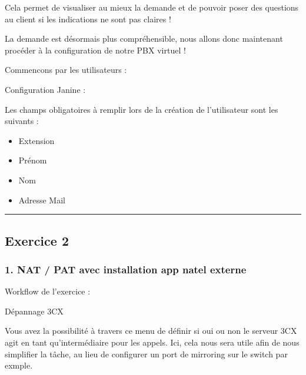 \documentclass[letterpaper,10pt,french]{sphinxmanual}
\begin{document}
\sphinxAtStartPar
Cela permet de visualiser au mieux la demande et de pouvoir poser des questions au client si les indications ne sont pas claires !

\noindent{}

\sphinxAtStartPar
La demande est désormais plus compréhensible, nous allons donc maintenant procéder à la configuration de notre PBX virtuel !

\sphinxAtStartPar
Commencons par les utilisateurs :

\sphinxAtStartPar


\noindent{}

\sphinxAtStartPar
Configuration Janine :

\noindent{}

\sphinxAtStartPar
Les champs obligatoires à remplir lors de la création de l’utilisateur sont les suivants :
\begin{itemize}
\item {} 
\sphinxAtStartPar
Extension

\item {} 
\sphinxAtStartPar
Prénom

\item {} 
\sphinxAtStartPar
Nom

\item {} 
\sphinxAtStartPar
Adresse Mail

\end{itemize}


\bigskip\hrule\bigskip



\subsection{Exercice 2}
\label{\detokenize{Documentation-M362:exercice-2}}

\subsubsection{1. NAT / PAT avec installation app natel externe}
\label{\detokenize{Documentation-M362:nat-pat-avec-installation-app-natel-externe}}
\sphinxAtStartPar
Workflow de l’exercice :

\sphinxAtStartPar
Dépannage 3CX

\noindent{}

\sphinxAtStartPar
Vous avez la possibilité à travers ce menu de définir si oui ou non le serveur 3CX agit en tant qu’intermédiaire pour les appels.
Ici, cela nous sera utile afin de nous simplifier la tâche, au lieu de configurer un port de mirroring sur le switch par exmple.
\end{document}
